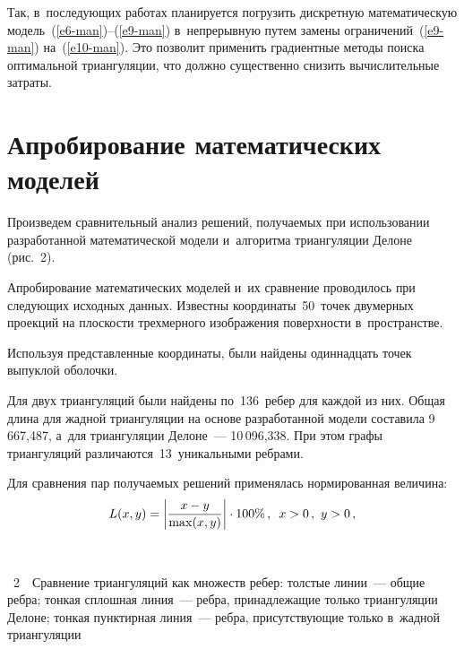 \begin{multicols}{2}
  Так, в~последующих работах планируется погрузить дискретную 
математическую модель~(\ref{e6-man})--(\ref{e9-man}) в~непрерывную путем 
замены ограничений~(\ref{e9-man}) на~(\ref{e10-man}). Это позволит 
применить градиентные методы поиска~\cite{13-man} оптимальной 
триангуляции, что должно существенно снизить вы\-чис\-ли\-тель\-ные затраты.

\vspace*{-6pt}

\section{Апробирование математических моделей}

  Произведем сравнительный анализ решений, по\-лу\-ча\-емых при использовании 
разработанной математической модели и~алгоритма триангуляции Делоне 
(рис.~2).


  
  Апробирование математических моделей и~их сравнение проводилось при 
сле\-ду\-ющих исходных данных. Известны координаты~50~точек двумерных 
проекций на плоскости трехмерного изображения по\-верх\-ности в~пространстве.
  
  Используя представленные координаты, были найдены одиннадцать точек 
выпуклой оболочки.
  
  Для двух триангуляций были найдены по~136~ребер для каж\-дой
  из них. Общая длина для жад\-ной триангуляции на основе разработанной 
модели составила 9\,667,487, а~для триангуляции Делоне~--- 10\,096,338. При 
этом графы триангуляций различаются~13~уникальными ребрами.
  
  Для сравнения пар по\-лу\-ча\-емых решений применялась нормированная 
величина:
  \begin{equation}
  L(x,y) =\left\vert  \fr{x-y}{\max(x,y)}\right\vert \cdot 100\%\,,\enskip x>0\,,\ 
y>0\,,
  \label{e11-man}
  \end{equation}
  
  \vspace*{9pt}
  
   { \begin{center}  %
 \vspace*{1pt}
  \mbox{%
 \epsfxsize=76.837mm 
 }

\end{center}


\noindent
{{\figurename~2}\ \ \small{Сравнение триангуляций как множеств ребер:
толстые линии~--- общие ребра; тонкая сплошная линия~--- реб\-ра, принадлежащие только триангуляции 
Делоне; тон\-кая пунктирная линия~--- реб\-ра, присутствующие только в~жад\-ной 
триангуляции}}
}


\end{multicols}
